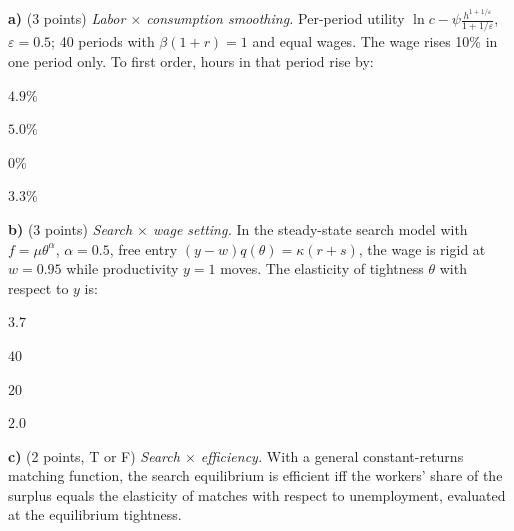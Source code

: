 \documentclass[11pt,a4paper]{article}
\begin{document}
\textbf{a)} (3 points) \emph{Labor $\times$ consumption smoothing.} Per-period utility $\ln c-\psi\frac{h^{1+1/\varepsilon}}{1+1/\varepsilon}$, $\varepsilon=0.5$; 40 periods with
$\beta(1+r)=1$ and equal wages. The wage rises 10\% in one period only. To first order, hours in that period rise by:
\begin{alternativas}
\item $4.9\%$
\item $5.0\%$
\item $0\%$
\item $3.3\%$
\end{alternativas}
\begin{sol}
\end{sol}

\medskip
\textbf{b)} (3 points) \emph{Search $\times$ wage setting.} In the steady-state search model with $f=\mu\theta^{\alpha}$, $\alpha=0.5$, free entry
$(y-w)q(\theta)=\kappa(r+s)$, the wage is rigid at $w=0.95$ while productivity $y=1$ moves. The elasticity of tightness $\theta$
with respect to $y$ is:
\begin{alternativas}
\item $3.7$
\item $40$
\item $20$
\item $2.0$
\end{alternativas}
\begin{sol}
\end{sol}

\medskip
\textbf{c)} (2 points, T or F) \emph{Search $\times$ efficiency.} With a general constant-returns matching function, the search
equilibrium is efficient iff the workers' share of the surplus equals the elasticity of matches with respect to
unemployment, evaluated at the equilibrium tightness.
\begin{sol}
\end{sol}
\end{document}
